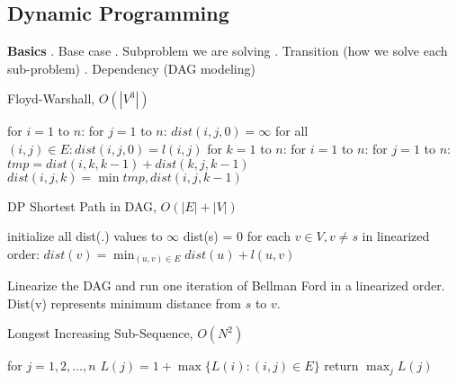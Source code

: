 \documentclass{article}
\begin{document}
\begin{multicols}{2}
\section*{Dynamic Programming}
\textbf{Basics} . Base case . Subproblem we are solving . Transition (how we solve each sub-problem) . Dependency (DAG modeling) \\
\setlength{\textfloatsep}{0.0cm}
\begin{algorithm}[H]
\label{alg:quad}
\caption{Floyd-Warshall, $O(|V^3|)$}\label{euclid}
\begin{algorithmic}[1]
\State for $i = 1$ to $n$:
\Indent 
\State for $j = 1$ to $n$: 
\Indent 
\State $dist(i, j, 0) = \infty$
\EndIndent 
\EndIndent 
\State for all $(i, j) \in E: dist(i, j, 0) = l(i, j)$
\State for $k = 1$ to $n$: 
\Indent 
\State for $i = 1$ to $n$:
\Indent 
\State for $j = 1$ to $n$: 
\Indent 
\State $tmp = dist(i,k,k-1)+dist(k, j, k-1)$
\State $dist(i,j,k)=\min{tmp,dist(i,j,k-1)}$
\EndIndent 
\EndIndent 
\EndIndent 
\end{algorithmic}
\end{algorithm}
\setlength{\floatsep}{0.0cm}
\setlength{\textfloatsep}{0.0cm}
\begin{algorithm}[H]
\label{alg:quad}
\caption{DP Shortest Path in DAG, $O(|E| + |V|)$}\label{euclid}
\begin{algorithmic}[1]
\State initialize all dist(.) values to $\infty$
\State dist(s) = 0
\State for each $v \in V, v \neq s$ in linearized order:
\Indent
\State $dist(v) = \min_{(u, v) \in E} dist(u) + l(u, v)$
\EndIndent
\end{algorithmic}
\end{algorithm}
\setlength{\floatsep}{0.0cm}
Linearize the DAG and run one iteration of Bellman Ford in a linearized order. Dist(v) represents minimum distance from $s$ to $v$. \newline
\setlength{\textfloatsep}{0.0cm}
\begin{algorithm}[H]
\label{alg:quad}
\caption{Longest Increasing Sub-Sequence, $O(N^2)$}\label{euclid}
\begin{algorithmic}[1]
\State for $j = 1, 2, \ldots, n$
\Indent
\State $L(j) = 1 + \max\{L(i):(i, j)\in E\}$
\EndIndent
\State return $\max_j L(j)$
\end{algorithmic}
\end{algorithm}

\end{multicols}
\end{document}
